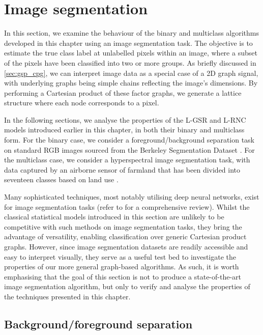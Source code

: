 \section{Image segmentation}

\label{sec:logistic_rnc_application}

In this section, we examine the behaviour of the binary and multiclass algorithms developed in this chapter using an image segmentation task. The objective is to estimate the true class label at unlabelled pixels within an image, where a subset of the pixels have been classified into two or more groups. As briefly discussed in \cref{sec:gsp_cpg}, we can interpret image data as a special case of a 2D graph signal, with underlying graphs being simple chains reflecting the image's dimensions. By performing a Cartesian product of these factor graphs, we generate a lattice structure where each node corresponds to a pixel.

In the following sections, we analyse the properties of the L-GSR and L-RNC models introduced earlier in this chapter, in both their binary and multiclass form. For the binary case, we consider a foreground/background separation task on standard RGB images sourced from the Berkeley Segmentation Dataset \citep{Martin2001}. For the multiclass case, we consider a hyperspectral image segmentation task, with data captured by an airborne sensor of farmland that has been divided into seventeen classes based on land use \citep{Baumgardner2015}. 


Many sophisticated techniques, most notably utilising deep neural networks, exist for image segmentation tasks (refer to \cite{Minaee2022,Wang2022} for a comprehensive review). Whilst the classical statistical models introduced in this section are unlikely to be competitive with such methods on image segmentation tasks, they bring the advantage of versatility, enabling classification over generic Cartesian product graphs. However, since image segmentation datasets are readily accessible and easy to interpret visually, they serve as a useful test bed to investigate the properties of our more general graph-based algorithms. As such, it is worth emphasising that the goal of this section is not to produce a state-of-the-art image segmentation algorithm, but only to verify and analyse the properties of the techniques presented in this chapter. 


\subsection{Background/foreground separation}

